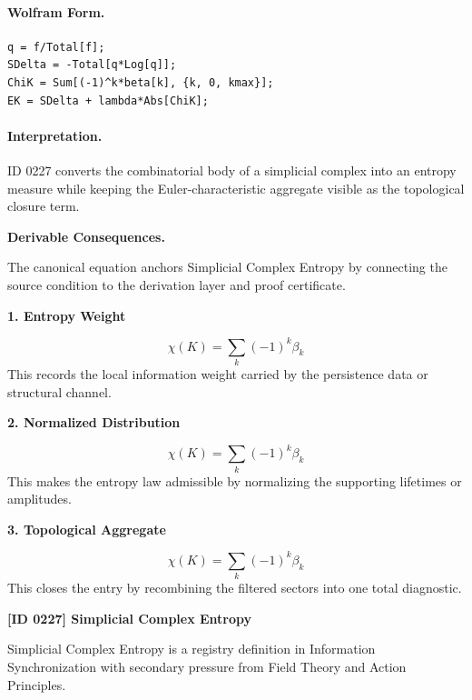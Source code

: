 \paragraph{Wolfram Form.}
\begin{verbatim}
q = f/Total[f];
SDelta = -Total[q*Log[q]];
ChiK = Sum[(-1)^k*beta[k], {k, 0, kmax}];
EK = SDelta + lambda*Abs[ChiK];
\end{verbatim}

\paragraph{Interpretation.}

ID 0227 converts the combinatorial body of a simplicial complex into an entropy measure while keeping the Euler-characteristic aggregate visible as the topological closure term.

\par\vspace{0.35em}
\noindent\textbf{Derivable Consequences.}\quad
\begingroup
\footnotesize
\raggedright
The canonical equation anchors Simplicial Complex Entropy by connecting the source condition to the derivation layer and proof certificate.
\par\endgroup

\noindent\textbf{1. Entropy Weight}\par
\[
\chi(K)=\sum_k(-1)^k\beta_k
\]
\noindent This records the local information weight carried by the persistence data or structural channel.\par
\noindent\textbf{2. Normalized Distribution}\par
\[
\chi(K)=\sum_k(-1)^k\beta_k
\]
\noindent This makes the entropy law admissible by normalizing the supporting lifetimes or amplitudes.\par
\noindent\textbf{3. Topological Aggregate}\par
\[
\chi(K)=\sum_k(-1)^k\beta_k
\]
\noindent This closes the entry by recombining the filtered sectors into one total diagnostic.\par

\clearpage
\noindent\textbf{[ID 0227] Simplicial Complex Entropy}\par
\vspace{0.35em}
\begingroup\small
{}
Simplicial Complex Entropy is a registry definition in Information Synchronization with secondary pressure from Field Theory and Action Principles.


